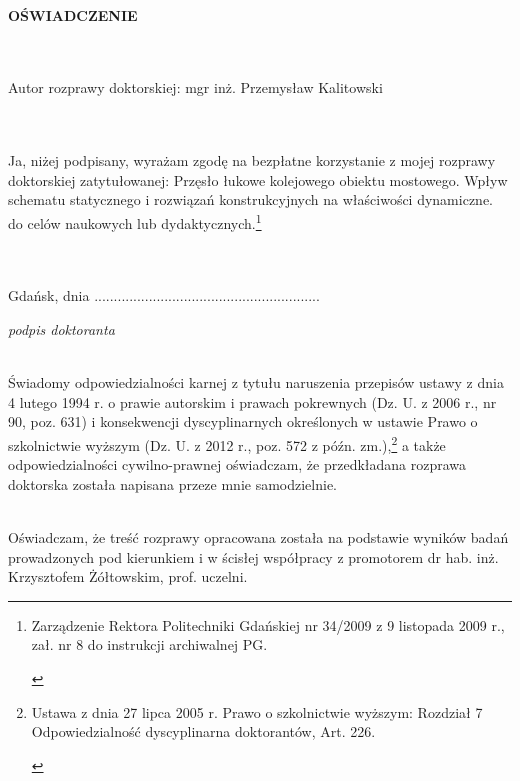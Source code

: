 \begin{figure}
	 \hfill
	
\end{figure}


\begin{myfont}
	\thispagestyle{plain}
	\noindent
	\\ 
	\textbf{OŚWIADCZENIE}
	
	\footnotesize
	\noindent
	\\ \\
	Autor rozprawy doktorskiej: mgr inż. Przemysław Kalitowski
	
	\noindent
	\\ \\
	Ja, niżej podpisany, wyrażam zgodę na bezpłatne korzystanie z mojej rozprawy doktorskiej zatytułowanej: 
	Przęsło łukowe kolejowego obiektu mostowego. Wpływ schematu statycznego i rozwiązań konstrukcyjnych na właściwości dynamiczne.
	\noindent
	do celów naukowych lub dydaktycznych.\footnote{\begin{myfont}\scriptsize 
			Zarządzenie Rektora Politechniki Gdańskiej nr 34/2009 z 9 listopada 2009 r., zał. nr 8 do instrukcji archiwalnej PG.\end{myfont}}
	
	\noindent
	\\ \\
	Gdańsk, dnia .............................\hfill.............................
	
	\scriptsize \noindent
	\null\hfill \textit{podpis doktoranta}
	
	
	\footnotesize \noindent
	\\
	Świadomy odpowiedzialności karnej z tytułu naruszenia przepisów ustawy z dnia 4 lutego 1994 r. o prawie autorskim i prawach pokrewnych (Dz. U. z 2006 r., nr 90, poz. 631) i konsekwencji dyscyplinarnych określonych w ustawie Prawo o szkolnictwie wyższym (Dz. U. z 2012 r., poz. 572 z późn. zm.),\footnote{\begin{myfont}\scriptsize Ustawa z dnia 27 lipca 2005 r. Prawo o szkolnictwie wyższym: Rozdział 7 Odpowiedzialność dyscyplinarna doktorantów, Art. 226.
	\end{myfont}}
	a także odpowiedzialności cywilno-prawnej oświadczam, że przedkładana rozprawa doktorska została napisana przeze mnie samodzielnie.
	
	\footnotesize \noindent
	\\
	Oświadczam, że treść rozprawy opracowana została na podstawie wyników badań prowadzonych pod kierunkiem i w ścisłej współpracy z promotorem dr hab. inż. Krzysztofem Żółtowskim, prof. uczelni.
	

\end{myfont}
